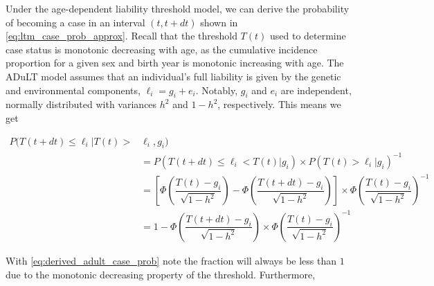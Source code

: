 Under the age-dependent liability threshold model, we can derive the probability of becoming a case in an interval $ (t, t+ dt) $ shown in \cref{eq:ltm_case_prob_approx}. Recall that the threshold $ T(t) $ used to determine case status is monotonic decreasing with age, as the cumulative incidence proportion for a given sex and birth year is monotonic increasing with age. The ADuLT model assumes that an individual's full liability is given by the genetic and environmental components, $ \ell_i = g_i + e_i $. Notably, $ g_i $ and $ e_i $ are independent, normally distributed with variances $ h^2 $ and $ 1 - h^2 $, respectively. This means we get


\begin{align}
	P(T(t + dt) \leq \ell_i | T(t) >& \ell_i, g_i)  \\
	&=P(T(t + dt) \leq \ell_i < T(t)|g_i) \times P(T(t) > \ell_i | g_i)^{-1}  \\
	&=
	\left[\Phi\left( \dfrac{T(t) - g_i}{\sqrt{1 - h^2}}\right) - \Phi\left( \dfrac{T(t + dt) - g_i}{\sqrt{1 - h^2}}\right)\right] \times
	\Phi \left( \dfrac{T(t) - g_i}{\sqrt{1 - h^2}}\right)^{-1} \\
	&=
	1 - \Phi\left( \dfrac{T(t + dt) - g_i}{\sqrt{1 - h^2}}\right) \times \Phi\left( \dfrac{T(t) - g_i}{\sqrt{1 - h^2}}\right)^{-1} \label{eq:derived_adult_case_prob}
\end{align}

With \cref{eq:derived_adult_case_prob} note the fraction will always be less than $ 1 $ due to the monotonic decreasing property of the threshold. Furthermore, 

